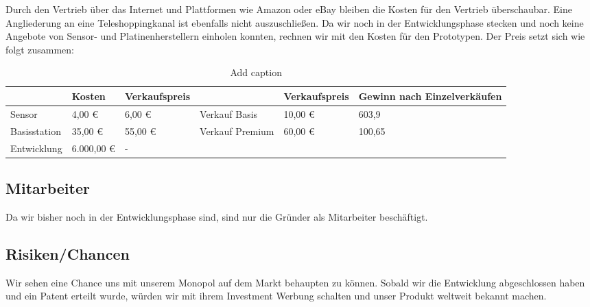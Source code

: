 			Durch den Vertrieb über das Internet und Plattformen wie Amazon oder eBay bleiben die Kosten für den Vertrieb überschaubar. Eine Angliederung an eine Teleshoppingkanal ist ebenfalls nicht auszuschließen. Da wir noch in der Entwicklungsphase stecken und noch keine Angebote von Sensor- und Platinenherstellern einholen konnten, rechnen wir mit den Kosten für den Prototypen. Der Preis setzt sich wie folgt zusammen:
\begin{table}[htbp]
  \centering
  \caption{Add caption}
    \begin{tabularx}{\textwidth}{|X|XXXXX|}
    \toprule
          & Kosten & Verkaufspreis &       & Verkaufspreis & Gewinn nach Einzelverkäufen \\
    \midrule
    Sensor & 4,00 € & 6,00 € & Verkauf Basis & 10,00 € & 603,9 \\
    Basisstation & 35,00 € & 55,00 € & Verkauf Premium & 60,00 € & 100,65 \\
    Entwicklung & 6.000,00 € & -     &       &       &  \\
    \bottomrule
    \end{tabularx}%
  \label{tab:addlabel}%
\end{table}%

\subsection{Mitarbeiter}
	Da wir bisher noch in der Entwicklungsphase sind, sind nur die Gründer als Mitarbeiter beschäftigt. 
			
\subsection{Risiken/Chancen}
	Wir sehen eine Chance uns mit unserem Monopol auf dem Markt behaupten zu können. 
			Sobald wir die Entwicklung abgeschlossen haben und ein Patent erteilt wurde, würden wir mit ihrem Investment Werbung schalten und unser Produkt weltweit bekannt machen.

